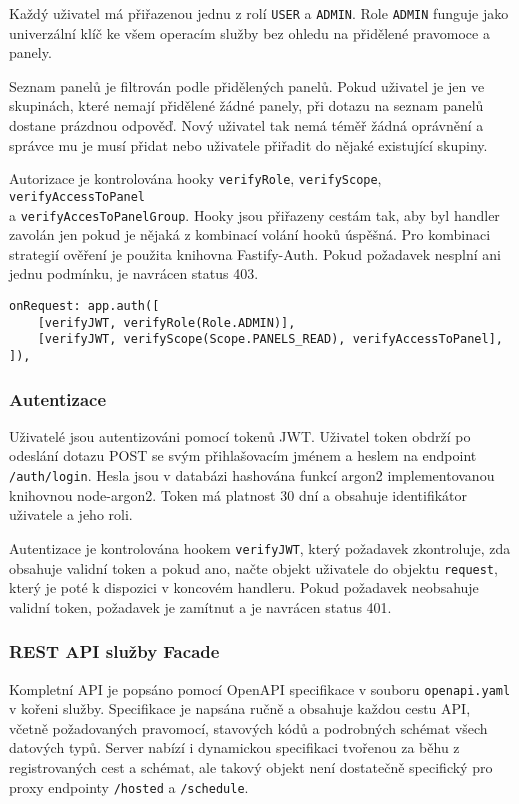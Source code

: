Každý uživatel má přiřazenou jednu z rolí \lstinline|USER| a \lstinline|ADMIN|. Role \lstinline|ADMIN| funguje jako univerzální klíč ke všem operacím služby bez ohledu na přidělené pravomoce a panely.

Seznam panelů je filtrován podle přidělených panelů. Pokud uživatel je jen ve skupinách, které nemají přidělené žádné panely, při dotazu na seznam panelů dostane prázdnou odpověď. Nový uživatel tak nemá téměř žádná oprávnění a správce mu je musí přidat nebo uživatele přiřadit do nějaké existující skupiny.

Autorizace je kontrolována hooky \lstinline|verifyRole|, \lstinline|verifyScope|, \lstinline|verifyAccessToPanel| \\a \lstinline|verifyAccesToPanelGroup|. Hooky jsou přiřazeny cestám tak, aby byl handler zavolán jen pokud je nějaká z kombinací volání hooků úspěšná. Pro kombinaci strategií ověření je použita knihovna Fastify-Auth\cite{FastifyFastifyauth2024}. Pokud požadavek nesplní ani jednu podmínku, je navrácen status 403.

\begin{lstlisting}[label=src:fastify-auth-hook,caption={Ověření, že požadavek GET /panels/\{panel\_id\} patří uživateli s rolí ADMIN nebo že má přístup k požadovanému panelu}]
onRequest: app.auth([
    [verifyJWT, verifyRole(Role.ADMIN)],
    [verifyJWT, verifyScope(Scope.PANELS_READ), verifyAccessToPanel],
]),
\end{lstlisting}

\subsubsection{Autentizace}
Uživatelé jsou autentizováni pomocí tokenů JWT. Uživatel token obdrží po odeslání dotazu POST se svým přihlašovacím jménem a heslem na endpoint \lstinline|/auth/login|. Hesla jsou v databázi hashována funkcí argon2 implementovanou knihovnou node-argon2\cite{althoffRanisaltNodeargon22024}. Token má platnost 30 dní a obsahuje identifikátor uživatele a jeho roli.

Autentizace je kontrolována hookem \lstinline|verifyJWT|, který požadavek zkontroluje, zda obsahuje validní token a pokud ano, načte objekt uživatele do objektu \lstinline|request|, který je poté k dispozici v koncovém handleru. Pokud požadavek neobsahuje validní token, požadavek je zamítnut a je navrácen status 401.

\subsubsection{REST API služby Facade}
Kompletní API je popsáno pomocí OpenAPI specifikace v souboru \lstinline|openapi.yaml| v kořeni služby. Specifikace je napsána ručně a obsahuje každou cestu API, včetně požadovaných pravomocí, stavových kódů a podrobných schémat všech datových typů. Server nabízí i dynamickou specifikaci tvořenou za běhu z registrovaných cest a schémat, ale takový objekt není dostatečně specifický pro proxy endpointy \lstinline|/hosted| a \lstinline|/schedule|. 


